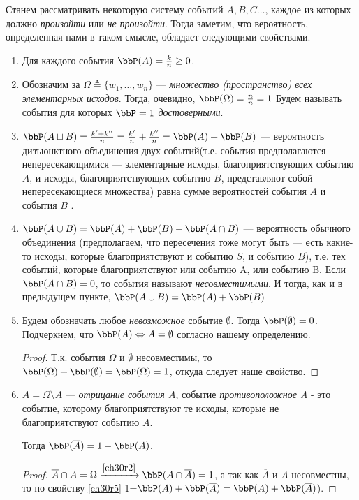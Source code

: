 Станем рассматривать некоторую систему событий $A,B,C\dots $, каждое из которых должно \textit{произойти} или \textit{не произойти}. Тогда заметим, что вероятность, определенная нами в таком смысле, обладает следующими свойствами.
\begin{enumerate}
\item 
Для каждого события $\bbP(A)=\frac{k}{n}\ge 0$.
\item \label{ch30r2}
Обозначим за $\Omega \triangleq \{w_1, \dots,w_n\}$ --- \textit{множество (пространство) всех элементарных исходов}. Тогда, очевидно, $\bbP(\Omega)=\frac{n}{n}=1$ Будем называть события для которых $\bbP=1$ \textit{достоверными}. 

\item 
$\bbP(A\sqcup B)=\frac{k'+k''}{n}=\frac{k'}{n}+\frac{k''}{n}=\bbP(A)+\bbP(B)$ --- вероятность дизъюнктного объединения двух событий(т.е. события предполагаются непересекающимися --- элементарные исходы, благоприятствующих событию $A$, и исходы, благоприятствующих событию $B$, представляют собой непересекающиеся множества) равна сумме вероятностей события $A$ и события $B$ .
\item \label{ch30r5}
$\bbP(A\cup B)=\bbP(A)+\bbP(B)-\bbP(A\cap B)$ --- вероятность обычного объединения (предполагаем, что пересечения тоже могут быть --- есть какие-то исходы, которые благоприятствуют и событию $S$, и событию $B$), т.е. тех событий, которые благоприятствуют или событию A, или событию B. Если $\bbP(A\cap B)=0$, то события называют \textit{несовместимыми}. И тогда, как и в предыдущем пункте, $\bbP(A\cup B)=\bbP(A)+\bbP(B)$
\item
Будем обозначать любое \textit{невозможное} событие $\emptyset$. Тогда $\bbP(\emptyset)=0$. Подчеркнем, что $\bbP(A) \Leftrightarrow A = \emptyset$ согласно нашему определению. 
\begin{proof}
Т.к. события $\Omega$ и $\emptyset$ несовместимы, то $\bbP(\Omega)+\bbP(\emptyset)=\bbP(\Omega)=1$, откуда следует наше свойство.
\end{proof}

\item
$\overline{A}=\Omega\setminus A$ --- \textit{отрицание события $A$}, событие \textit{противоположное A} - это событие, которому благоприятствуют те исходы, которые не благоприятствуют событию $A$. 

Тогда $\bbP(\overline{A})=1-\bbP(A)$.
\begin{proof}
$\overline{A}\cap A=\Omega\xrightarrow{\ref{ch30r2}}\bbP(A\cap\overline{A}) = 1$, а так как $\overline{A}$ и $A$ несовместны, то по свойству \ref{ch30r5}  1=$\bbP(A)+\bbP(\overline{A}) = \bbP(A)+\bbP(\overline{A})$).
\end{proof}


\end{enumerate}
